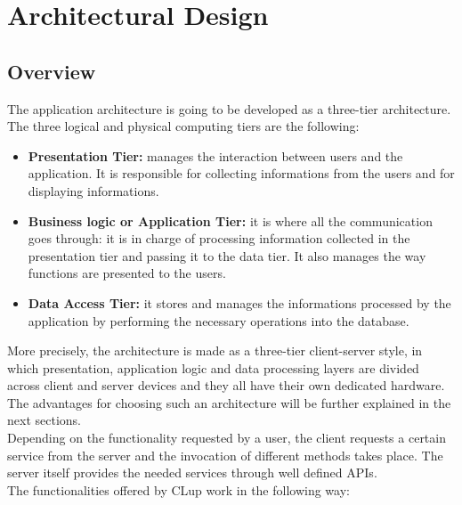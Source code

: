 \documentclass{article}
\begin{document}
\section{Architectural Design}
\subsection{Overview}
The application architecture is going to be developed as a three-tier architecture. The three logical and physical computing tiers are the following:
\begin{itemize}
\item\textbf{Presentation Tier:} manages the interaction between users and the application. It is responsible for collecting informations from the users and for displaying informations.
\item\textbf{Business logic or Application Tier:} it is where all the communication goes through: it is in charge of processing information collected in the presentation tier and passing it to the data tier. It also manages the way functions are presented to the users.
\item\textbf{Data Access Tier:} it stores and manages the informations processed by the application by performing the necessary operations into the database.
\end{itemize}
More precisely, the architecture is made as a three-tier client-server style, in which presentation, application logic and data processing layers are divided across client and server devices and they all have their own dedicated hardware. The advantages for choosing such an architecture will be further explained in the next sections.
\smallskip\\
Depending on the functionality requested by a user, the client requests a certain service from the server and the invocation of different methods takes place. The server itself provides the needed services through well defined APIs.
\smallskip\\
The functionalities offered by CLup work in the following way:
\end{document}
